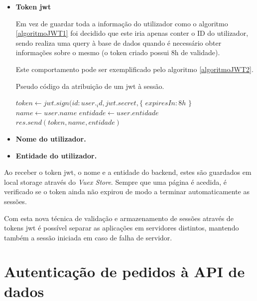 \begin{itemize}
    \item \textbf{Token \gls{jwt}}
    
    Em vez de guardar toda a informação do utilizador como o algoritmo \ref{algoritmoJWT1} foi decidido que este iria apenas conter o ID do utilizador, sendo realiza uma query à base de dados quando é necessário obter informações sobre o mesmo (o token criado possui 8h de validade).
    
    Este comportamento pode ser exemplificado pelo algoritmo \ref{algoritmoJWT2}.
    
    \begin{algorithm}
        \caption{Pseudo código da atribuição de um \gls{jwt} à sessão.}
        \label{algoritmoJWT2}
        \begin{algorithmic}[1]
            \State $token \gets jwt.sign({id: user._id}, jwt.secret, \{$
            \State \indent $expiresIn : 8h$
            \State $\}$
            \State $name \gets user.name$
            \State $entidade \gets user.entidade$
            \State $res.send(token,name,entidade)$
        \EndFunction
        \end{algorithmic}
    \end{algorithm}
        
    \item \textbf{Nome do utilizador.}
    
    
    \item \textbf{Entidade do utilizador.}
\end{itemize}

Ao receber o token \gls{jwt}, o nome e a entidade do backend, estes são guardados em local storage através do \emph{Vuex Store}. Sempre que uma página é acedida, é verificado se o token ainda não expirou de modo a terminar automaticamente as sessões.

Com esta nova técnica de validação e armazenamento de sessões através de tokens \gls{jwt} é possível separar as aplicações em servidores distintos, mantendo também a sessão iniciada em caso de falha de servidor.

\cleardoublepage
\section{Autenticação de pedidos à API de dados} \label{autenticaoPedidos}

